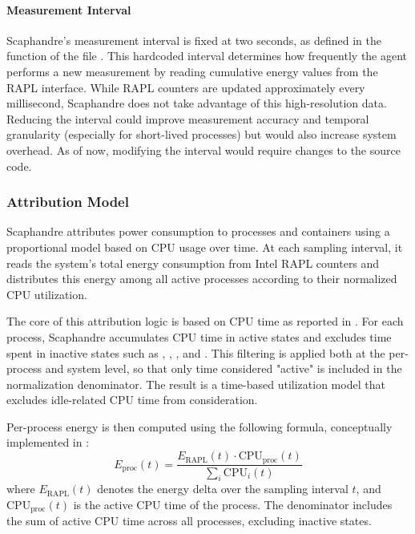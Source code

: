 \paragraph{Measurement Interval}
Scaphandre's measurement interval is fixed at two seconds, as defined in the  function of the file . This hardcoded interval determines how frequently the agent performs a new measurement by reading cumulative energy values from the RAPL interface. While RAPL counters are updated approximately every millisecond, Scaphandre does not take advantage of this high-resolution data. Reducing the interval could improve measurement accuracy and temporal granularity (especially for short-lived processes) but would also increase system overhead. As of now, modifying the interval would require changes to the source code.

\subsubsection{Attribution Model}
\label{sec:scaphandre-attribution}

Scaphandre attributes power consumption to processes and containers using a proportional model based on CPU usage over time. At each sampling interval, it reads the system's total energy consumption from Intel RAPL counters and distributes this energy among all active processes according to their normalized CPU utilization.

The core of this attribution logic is based on CPU time as reported in . For each process, Scaphandre accumulates CPU time in active states and excludes time spent in inactive states such as , , , and . This filtering is applied both at the per-process and system level, so that only time considered "active" is included in the normalization denominator. The result is a time-based utilization model that excludes idle-related CPU time from consideration.

Per-process energy is then computed using the following formula, conceptually implemented in :
\begin{equation}
E_{\text{proc}}(t) = \frac{E_{\text{RAPL}}(t) \cdot \text{CPU}_{\text{proc}}(t)}{\sum_i \text{CPU}_i(t)}
\end{equation}
where \( E_{\text{RAPL}}(t) \) denotes the energy delta over the sampling interval \( t \), and \( \text{CPU}_{\text{proc}}(t) \) is the active CPU time of the process. The denominator includes the sum of active CPU time across all processes, excluding inactive states.

